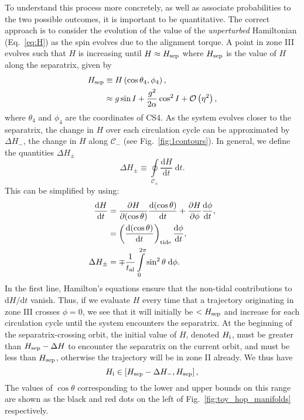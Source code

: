 \documentclass[
        fleqn,
        usenatbib,
        referee,
    ]{mnras}
\newcommand*{\rd}[2]{\frac{\mathrm{d}#1}{\mathrm{d}#2}}
\newcommand*{\pd}[2]{\frac{\partial#1}{\partial#2}}
\newcommand*{\rdil}[2]{\mathrm{d}#1/\mathrm{d}#2}
\newcommand*{\p}[1]{\left(#1\right)}
\newcommand*{\s}[1]{\left[#1\right]}
\begin{document}
To understand this process more concretely, as well as associate probabilities
to the two possible outcomes, it is important to be quantitative. The correct
approach is to consider the evolution of the value of the \emph{unperturbed}
Hamiltonian (Eq.~\ref{eq:H}) as the spin evolves due to the alignment torque. A
point in zone III evolves such that $H$ is increasing until $H \approx H_{\rm
sep}$ where $H_{\rm sep}$ is the value of $H$ along the separatrix, given by
\begin{align}
    H_{\rm sep} &\equiv H\p{\cos \theta_{\rm 4}, \phi_{\rm 4}},\nonumber\\
        &\approx g\sin I + \frac{g^2}{2\alpha}\cos^2 I +
            \mathcal{O}\p{\eta^2},\label{eq:def_Hsep}
\end{align}
where $\theta_4$ and $\phi_4$ are the coordinates of CS4. As the system evolves
closer to the separatrix, the change in $H$ over each circulation cycle can be
approximated by $\Delta H_-$, the change in $H$ along $\mathcal{C}_-$ (see
Fig.~\ref{fig:1contours}). In general, we define the quantities $\Delta H_{\pm}$
\begin{equation}
    \Delta H_{\pm} \equiv \oint\limits_{\mathcal{C}_{\pm}}
        \rd{H}{t}\;\mathrm{d}t.\label{eq:def_dHpm}
\end{equation}
This can be simplified by using:
\begin{align}
    \rd{H}{t} &=
            \pd{H}{(\cos \theta)}\rd{(\cos \theta)}{t}
            + \pd{H}{\phi}\rd{\phi}{t},\nonumber\\
        &= \p{\rd{(\cos\theta)}{t}}_{\rm tide} \rd{\phi}{t},\\
    \Delta H_{\pm} &= \mp\frac{1}{t_{\rm al}}
        \int\limits_0^{2\pi} \sin^2\theta\;\mathrm{d}\phi.
\end{align}
In the first line, Hamilton's equations ensure that the non-tidal contributions
to $\rdil{H}{t}$ vanish. Thus, if we evaluate $H$ every time that a trajectory
originating in zone III crosses $\phi = 0$, we see that it will initially be $<
H_{\rm sep}$ and increase for each circulation cycle until the system encounters
the separatrix. At the beginning of the separatrix-crossing orbit, the initial
value of $H$, denoted $H_{\rm i}$, must be greater than $H_{\rm sep} - \Delta H$
to encounter the separatrix on the current orbit, and must be less than $H_{\rm
sep}$, otherwise the trajectory will be in zone II already. We thus have
\begin{equation}
    H_{\rm i} \in \s{ H_{\rm sep} - \Delta H_-,  H_{\rm sep} }
        \label{eq:Hi_range},
\end{equation}
The values of $\cos \theta$ corresponding to the lower and upper bounds on this
range are shown as the black and red dots on the left of
Fig.~\ref{fig:toy_hop_manifolds} respectively.
\end{document}
